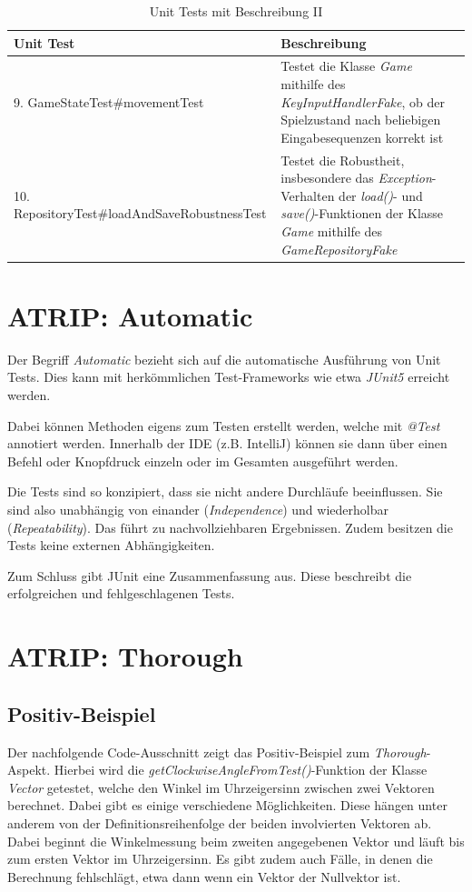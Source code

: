 \begin{table}[H]
    \centering
    \begin{tabular}{|p{7cm}|p{7cm}|}
      \hline
      \textbf{Unit Test} & \textbf{Beschreibung} \\
      \hline
      9. GameStateTest\#movementTest & Testet die Klasse \textit{Game} mithilfe des \textit{KeyInputHandlerFake}, ob der Spielzustand nach beliebigen Eingabesequenzen korrekt ist \\
      \hline
      10. RepositoryTest\#loadAndSaveRobustnessTest & Testet die Robustheit, insbesondere das \textit{Exception}-Verhalten der \textit{load()}- und \textit{save()}-Funktionen der Klasse \textit{Game} mithilfe des \textit{GameRepositoryFake} \\
      \hline
    \end{tabular}
    \caption{Unit Tests mit Beschreibung II}
\end{table}

\section{ATRIP: Automatic}
Der Begriff \textit{Automatic} bezieht sich auf die automatische
Ausführung von Unit Tests. Dies kann mit herkömmlichen Test-Frameworks
wie etwa \textit{JUnit5} erreicht werden. 

Dabei können Methoden eigens zum Testen erstellt werden, welche mit
\textit{@Test} annotiert werden. Innerhalb der IDE (z.B. IntelliJ)
können sie dann über einen Befehl oder Knopfdruck einzeln oder im
Gesamten ausgeführt werden.

Die Tests sind so konzipiert, dass sie nicht andere Durchläufe beeinflussen.
Sie sind also unabhängig von einander (\textit{Independence}) und 
wiederholbar (\textit{Repeatability}). Das führt zu nachvollziehbaren
Ergebnissen. Zudem besitzen die Tests keine externen Abhängigkeiten.

Zum Schluss gibt JUnit eine Zusammenfassung aus. Diese beschreibt die
erfolgreichen und fehlgeschlagenen Tests.
\pagebreak

\section{ATRIP: Thorough}
\subsection*{Positiv-Beispiel}
Der nachfolgende Code-Ausschnitt zeigt das Positiv-Beispiel zum
\textit{Thorough}-Aspekt. Hierbei wird die
\textit{getClockwiseAngleFromTest()}-Funktion der Klasse
\textit{Vector} getestet, welche den Winkel im Uhrzeigersinn 
zwischen zwei Vektoren berechnet. Dabei gibt es einige verschiedene
Möglichkeiten. Diese hängen unter anderem von der Definitionsreihenfolge
der beiden involvierten Vektoren ab. Dabei beginnt die Winkelmessung
beim zweiten angegebenen Vektor und läuft bis zum ersten Vektor im
Uhrzeigersinn. Es gibt zudem auch Fälle, in denen die Berechnung
fehlschlägt, etwa dann wenn ein Vektor der Nullvektor ist.


